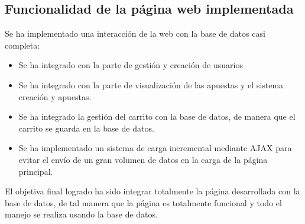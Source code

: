 \documentclass{article}
\begin{document}
\subsection{Funcionalidad de la página web implementada}

Se ha implementado una interacción de la web con la base de datos casi completa:
\begin{itemize}
\item Se ha integrado con la parte de gestión y creación de usuarios
\item Se ha integrado con la parte de visualización de las apuestas y el sistema creación y apuestas.
\item Se ha integrado la gestión del carrito con la base de datos, de manera que el carrito se guarda en la base de datos.
\item Se ha implementado un sistema de carga incremental mediante AJAX para evitar el envío de un gran volumen de datos en la carga de la página principal.
\end{itemize}

El objetiva final logrado ha sido integrar totalmente la página desarrollada con la base de datos, de tal manera que la página es totalmente funcional y todo el manejo se realiza usando la base de datos.
\end{document}
